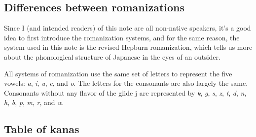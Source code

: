 \documentclass[UTF8, a4paper, oneside, scheme=plain]{ctexrep}
\newcommand{\corpus}[1]{\emph{#1}}
\begin{document}
\subsection{Differences between romanizations}\label{sec:romanization}

Since I (and intended readers) of this note are all non-native speakers,
it's a good idea to first introduce the romanization systems,
and for the same reason,
the system used in this note is the revised Hepburn romanization,
which tells us more about the phonological structure of Japanese 
in the eyes of an outsider.

All systems of romanization use the same set of letters to represent the five vowels:
\corpus{a}, \corpus{i}, \corpus{u}, \corpus{e}, and \corpus{o}.
The letters for the consonants are also largely the same.
Consonants without any flavor of the glide j are represented by 
\corpus{k}, \corpus{g}, \corpus{s}, \corpus{z}, \corpus{t}, \corpus{d}, \corpus{n}, 
\corpus{h}, \corpus{b}, \corpus{p}, \corpus{m}, \corpus{r}, and \corpus{w}.



\subsection{Table of kanas}\label{sec:kana}
\end{document}
